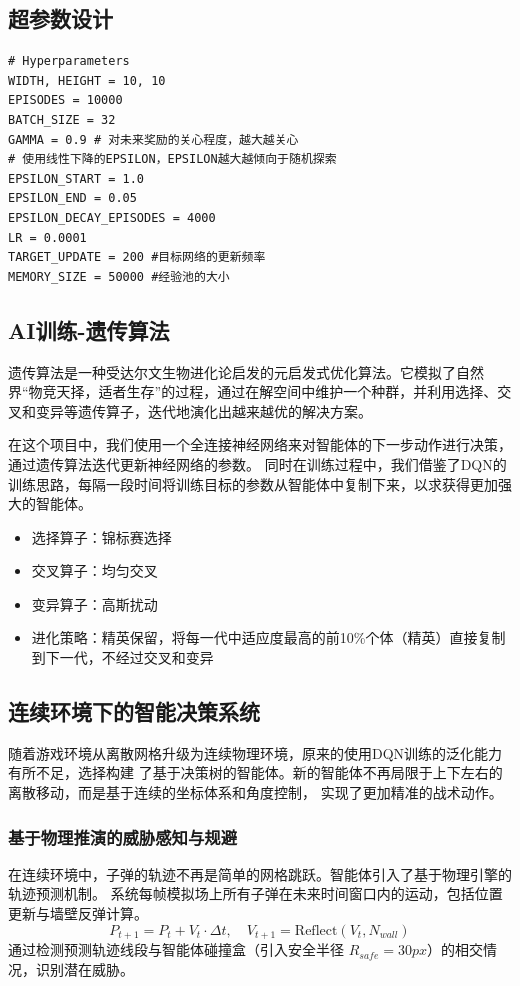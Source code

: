 \documentclass[conference]{IEEEtran}
\begin{document}
\subsection{超参数设计}
\begin{lstlisting}
# Hyperparameters
WIDTH, HEIGHT = 10, 10
EPISODES = 10000 
BATCH_SIZE = 32
GAMMA = 0.9 # 对未来奖励的关心程度，越大越关心
# 使用线性下降的EPSILON，EPSILON越大越倾向于随机探索
EPSILON_START = 1.0
EPSILON_END = 0.05
EPSILON_DECAY_EPISODES = 4000
LR = 0.0001 
TARGET_UPDATE = 200 #目标网络的更新频率
MEMORY_SIZE = 50000 #经验池的大小
\end{lstlisting}

\subsection{AI训练-遗传算法}
遗传算法是一种受达尔文生物进化论启发的元启发式优化算法。它模拟了自然界“物竞天择，适者生存”的过程，通过在解空间中维护一个种群，并利用选择、交叉和变异等遗传算子，迭代地演化出越来越优的解决方案。\par

在这个项目中，我们使用一个全连接神经网络来对智能体的下一步动作进行决策，通过遗传算法迭代更新神经网络的参数。
同时在训练过程中，我们借鉴了DQN的训练思路，每隔一段时间将训练目标的参数从智能体中复制下来，以求获得更加强大的智能体。

\begin{itemize}
    \item 选择算子：锦标赛选择
    \item 交叉算子：均匀交叉
    \item 变异算子：高斯扰动
    \item 进化策略：精英保留，将每一代中适应度最高的前10\%个体（精英）直接复制到下一代，不经过交叉和变异
\end{itemize}

\subsection{连续环境下的智能决策系统}
随着游戏环境从离散网格升级为连续物理环境，原来的使用DQN训练的泛化能力有所不足，选择构建
了基于决策树的智能体。新的智能体不再局限于上下左右的离散移动，而是基于连续的坐标体系和角度控制，
实现了更加精准的战术动作。

\subsubsection{基于物理推演的威胁感知与规避}
在连续环境中，子弹的轨迹不再是简单的网格跳跃。智能体引入了基于物理引擎的轨迹预测机制。
系统每帧模拟场上所有子弹在未来时间窗口内的运动，包括位置更新与墙壁反弹计算。
$$
P_{t+1} = P_t + V_t \cdot \Delta t, \quad V_{t+1} = \text{Reflect}(V_t, N_{wall})
$$
通过检测预测轨迹线段与智能体碰撞盒（引入安全半径 $R_{safe}=30px$）的相交情况，识别潜在威胁。
\end{document}
